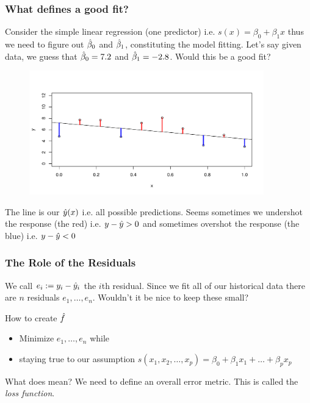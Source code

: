 \documentclass[handout]{beamer}
\begin{document}
\begin{frame}\frametitle{What defines a good fit?}

\small

Consider the simple linear regression (one predictor) i.e. $s(x) = \beta_0 + \beta_1 x$ thus we need to figure out $\hat{\beta}_0$ and  $\hat{\beta}_1$, constituting the model fitting. Let's say given data, we guess that $\hat{\beta}_0 = 7.2$ and $\hat{\beta}_1 = -2.8$. Would this be a good fit?

\vspace{-0.5cm}
\begin{figure}
\centering\includegraphics[width=4.0in]{residuals}
\end{figure}

The line is our $\hat{y}(x)$ i.e. all possible predictions. Seems sometimes we undershot the response (the red) i.e. $y - \hat{y} > 0$ and sometimes overshot the response (the blue) i.e. $y - \hat{y} < 0$

	
\end{frame}

\begin{frame}\frametitle{The Role of the Residuals}

We call $e_i := y_i - \hat{y}_i$ the $i$th residual. Since we fit all of our historical data there are $n$ residuals $e_1, \ldots, e_n$. Wouldn't it be nice to keep these small?

\begin{block}{How to create $\hat{f}$}
\begin{itemize}
\item Minimize $e_1, \ldots, e_n$ while
\item staying true to our assumption $s(x_1, x_2, \ldots, x_p) = \beta_0 + \beta_1 x_1 + \ldots + \beta_p x_p$
\end{itemize}
\end{block}

What does  mean? We need to define an overall error metric. This is called the \emph{loss function}.
	
\end{frame}
\end{document}
